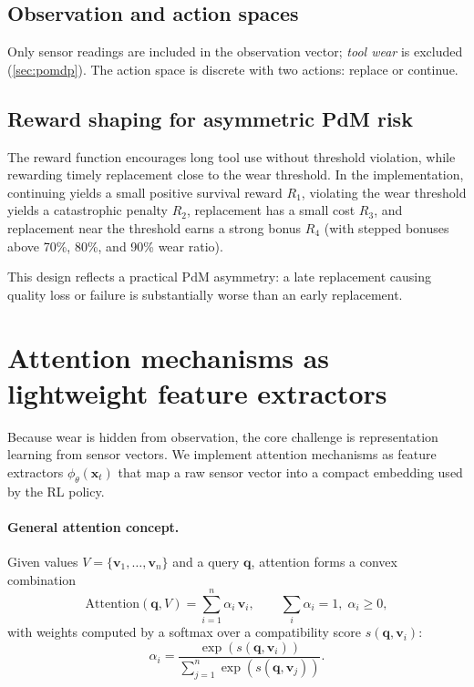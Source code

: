 \documentclass[11pt]{article}
\begin{document}
\subsection{Observation and action spaces}
Only sensor readings are included in the observation vector; \emph{tool wear} is excluded (\cref{sec:pomdp}). The action space is discrete with two actions: replace or continue.

\subsection{Reward shaping for asymmetric PdM risk}
\label{sec:reward}
The reward function encourages long tool use without threshold violation, while rewarding timely replacement close to the wear threshold. In the implementation, continuing yields a small positive survival reward $R_1$, violating the wear threshold yields a catastrophic penalty $R_2$, replacement has a small cost $R_3$, and replacement near the threshold earns a strong bonus $R_4$ (with stepped bonuses above 70\%, 80\%, and 90\% wear ratio).

This design reflects a practical PdM asymmetry: a late replacement causing quality loss or failure is substantially worse than an early replacement.

\section{Attention mechanisms as lightweight feature extractors}
\label{sec:attention}
Because wear is hidden from observation, the core challenge is representation learning from sensor vectors. We implement attention mechanisms as feature extractors $\phi_\theta(\mathbf{x}_t)$ that map a raw sensor vector into a compact embedding used by the RL policy.

\paragraph{General attention concept.}
Given values $V=\{\mathbf{v}_1,\ldots,\mathbf{v}_n\}$ and a query $\mathbf{q}$, attention forms a convex combination
\begin{equation}
\mathrm{Attention}(\mathbf{q},V)=\sum_{i=1}^{n}\alpha_i\,\mathbf{v}_i,\qquad \sum_i\alpha_i=1,\;\alpha_i\ge 0,
\end{equation}
with weights computed by a softmax over a compatibility score $s(\mathbf{q},\mathbf{v}_i)$:
\begin{equation}
\alpha_i = \frac{\exp(s(\mathbf{q},\mathbf{v}_i))}{\sum_{j=1}^n\exp(s(\mathbf{q},\mathbf{v}_j))}.
\end{equation}
\end{document}
